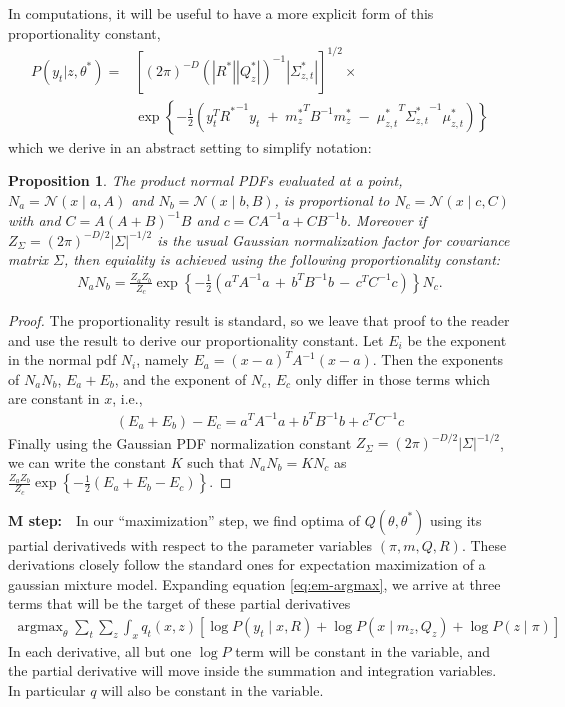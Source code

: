 \documentclass{article}         %
\newtheorem{proposition}{Proposition}[section]
\DeclareMathOperator{\argmax}{\arg\max}
\newcommand{\inv}{^{-1}}
\newcommand{\NN}{\mathcal{N}}
\newcommand{\abs}[1]{\left| #1 \right|}
\newcommand{\cb}[1]{\left\{ #1 \right\}}
\newcommand{\pn}[1]{\left( #1 \right)}
\newcommand{\bc}[1]{\left[ #1 \right]}
\begin{document}
In computations, it will be useful to have a more explicit form of this proportionality constant,
\begin{align}
    P(y_t | z, \theta^*) =& \bc{\pn{2\pi}^{-D} \pn{\abs{R^*} \abs{Q_z^*}}\inv \abs{ \Sigma^*_{z, t}}}^{1/2} \times \\
     & \exp\cb{-\frac{1}{2}\pn{y_t^T{R^*}\inv y_t \;+\; {m_z^*}^TB\inv {m_z^*} \;-\; {\mu_{z, t}^*}^T {\Sigma_{z, t}^*}\inv {\mu_{z, t}^*}}}
\end{align}
which we derive in an abstract setting to simplify notation:
\begin{proposition}
    The product normal PDFs evaluated at a point, $N_a = \NN(x\mid a, A)$ and $N_b = \NN(x\mid b, B)$, is proportional to $N_c = \NN(x\mid c, C)$ with and $C = A\pn{A + B}\inv B$ and $c = CA\inv a + CB\inv b$. Moreover if $Z_\Sigma = \pn{2\pi}^{-D/2}\abs{\Sigma}^{-1/2}$ is the usual Gaussian normalization factor for covariance matrix $\Sigma$, then equiality is achieved using the following proportionality constant:
    \begin{align}
        N_a N_b = \frac{Z_aZ_b}{Z_c} \exp\cb{-\frac{1}{2}\pn{a^TA\inv a \,+\, b^TB\inv b \,-\, c^T C\inv c}} N_c.
    \end{align}
\end{proposition}
\begin{proof}
The proportionality result is standard, so we leave that proof to the reader and use the result to derive our proportionality constant. Let $E_i$ be the exponent in the normal pdf $N_i$, namely $E_a = (x - a)^TA\inv (x - a)$. Then the exponents of $N_aN_b$, $E_a + E_b$, and the exponent of $N_c$, $E_c$ only differ in those terms which are constant in $x$, i.e., 
\begin{align}
    \pn{E_a + E_b} - E_c = a^TA\inv a + b^TB\inv b + c^T C\inv c
\end{align}
Finally using the Gaussian PDF normalization constant $Z_\Sigma = \pn{2\pi}^{-D/2}\abs{\Sigma}^{-1/2}$, we can write the constant $K$ such that $N_aN_b = K N_c$ as $\frac{Z_aZ_b}{Z_c} \exp\cb{-\frac{1}{2}\pn{E_a + E_b - E_c}}$.
\end{proof}

\textbf{M step:}\ \ In our ``maximization'' step, we find optima of $Q(\theta, \theta^*)$ using its partial derivativeds with respect to the parameter variables $(\pi, m, Q, R)$. These derivations closely follow the standard ones for expectation maximization of a gaussian mixture model. Expanding equation \ref{eq:em-argmax}, we arrive at three terms that will be the target of these partial derivatives
\begin{align}
    \argmax_{\theta} \sum_{t}\sum_{z}\int_{x} q_t(x, z) \bc{ \log P(y_t \mid x, R) + \log P(x \mid m_{z}, Q_{z}) + \log P(z \mid \pi)}
\end{align}
In each derivative, all but one $\log P$ term will be constant in the variable, and the partial derivative will move inside the summation and integration variables. In particular $q$ will also be constant in the variable.   
\end{document}
